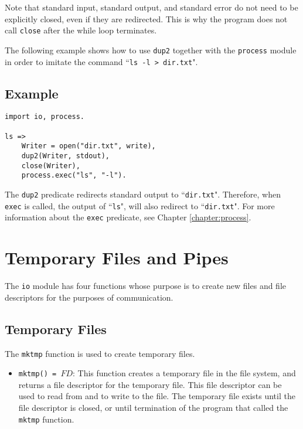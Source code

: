 {Note that standard input, standard output, and standard error do not need to be explicitly closed, even if they are redirected.  This is why the program does not call \texttt{close} after the while loop terminates.

The following example shows how to use \texttt{dup2} together with the \texttt{process} module in order to imitate the command ``\texttt{ls -l > dir.txt}".

\subsection*{Example}
\begin{verbatim}
import io, process.

ls =>
    Writer = open("dir.txt", write),
    dup2(Writer, stdout),
    close(Writer),
    process.exec("ls", "-l").
\end{verbatim}

The \texttt{dup2} predicate redirects standard output to ``\texttt{dir.txt}".  Therefore, when \texttt{exec} is called, the output of ``\texttt{ls}", will also redirect to ``\texttt{dir.txt}".  For more information about the \texttt{exec} predicate, see Chapter \ref{chapter:process}.

\section{Temporary Files and Pipes}
The \texttt{io} module has four functions whose purpose is to create new files and file descriptors for the purposes of communication.

\subsection{Temporary Files}
The \texttt{mktmp} function is used to create temporary files.
\begin{itemize}
\item \texttt{mktmp() = $FD$}: This function creates a temporary file in the file system, and returns a file descriptor for the temporary file.  This file descriptor can be used to read from and to write to the file.  The temporary file exists until the file descriptor is closed, or until termination of the program that called the \texttt{mktmp} function.
\end{itemize}

}
